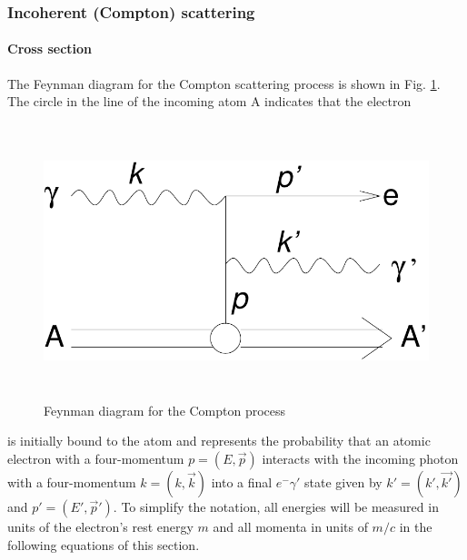 \subsubsection{Incoherent (Compton) scattering}
\setcounter{equation}{0}
\label{compton}

\paragraph{Cross section}\hfill

The Feynman diagram for the Compton scattering process is
shown in Fig. \ref{compt_fig}. The circle in the line
of the incoming atom A indicates that the electron
\begin{figure}[h]
\includegraphics[height=8cm,width=12cm]{figures/compt}
\caption{\label{compt_fig} Feynman diagram for the Compton process}
\end{figure}
is initially bound to the atom and represents the probability
that an atomic electron with a four-momentum $p = (E,\vec{p})$
interacts with the incoming photon with a four-momentum
$k=(k,\vec{k})$ into a final $e^-\gamma'$ state given by
$k'=(k',\vec{k'})$ and $p'=(E',\vec{p}')$.
To simplify the notation, all energies will be measured
in units of the electron's rest energy $m$ and all momenta
in units of $m/c$ in the following equations of this
section.

